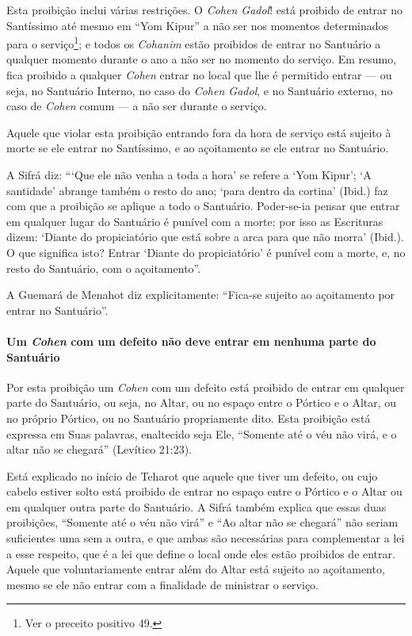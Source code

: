 Esta proibição inclui várias restrições. O \textit{Cohen Gadol}! está
proibido de entrar no Santíssimo até mesmo em ``Yom Kipur'' a não ser
nos momentos determinados para o serviço\footnote{Ver o preceito positivo 49.}; e todos
os \textit{Cohanim} estão proibidos de entrar no Santuário a qualquer
momento durante o ano a não ser no momento do serviço. Em resumo, fica
proibido a qualquer \textit{Cohen} entrar no local que lhe é permitido entrar
--- ou seja, no Santuário Interno, no caso do \textit{Cohen Gadol}, e no
Santuário externo, no caso de \textit{Cohen} comum --- a não ser durante o
serviço.

Aquele que violar esta proibição entrando fora da hora de serviço está
sujeito à morte se ele entrar no Santíssimo, e ao açoitamento se ele
entrar no Santuário.

A Sifrá diz: ```Que ele não venha a toda a hora' se refere a `Yom
Kipur'; `A santidade' abrange também o resto do ano; `para dentro da
cortina' (Ibid.) faz com que a proibição se aplique a todo o Santuário.
Poder-se-ia pensar que entrar em qualquer lugar do Santuário é punível
com a morte; por isso as Escrituras dizem: `Diante do propiciatório que
está sobre a arca para que não morra' (Ibid.). O que significa isto?
Entrar `Diante do propiciatório' é punível com a morte, e, no resto do
Santuário, com o açoitamento''.

A Guemará de Menahot diz explicitamente: ``Fica-se sujeito ao
açoitamento por entrar no Santuário''.

\paragraph{Um \textit{Cohen} com um defeito não deve entrar em nenhuma parte do
Santuário}

Por esta proibição um \textit{Cohen} com um defeito está proibido de entrar
em qualquer parte do Santuário, ou seja, no Altar, ou no espaço entre o
Pórtico e o Altar, ou no próprio Pórtico, ou no Santuário propriamente
dito. Esta proibição está expressa em Suas palavras, enaltecido seja
Ele, ``Somente até o véu não virá, e o altar não se chegará'' (Levítico
21:23).

Está explicado no início de Teharot que aquele que tiver um defeito, ou
cujo cabelo estiver solto está proibido de entrar no espaço entre o
Pórtico e o Altar ou em qualquer outra parte do Santuário. A Sifrá
também explica que essas duas proibições, ``Somente até o véu não virá''
e ``Ao altar não se chegará'' não seriam suficientes uma sem a outra, e
que ambas são necessárias para complementar a lei a esse respeito, que é
a lei que define o local onde eles estão proibidos de entrar. Aquele que
voluntariamente entrar além do Altar está sujeito ao açoitamento, mesmo
se ele não entrar com a finalidade de ministrar o serviço.

